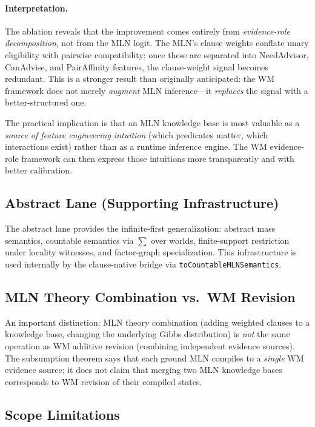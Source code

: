 \documentclass[11pt,openany]{report}
\begin{document}
\paragraph{Interpretation.}
The ablation reveals that the improvement comes entirely from
\emph{evidence-role decomposition}, not from the MLN logit.
The MLN's clause weights conflate unary eligibility with pairwise
compatibility; once these are separated into NeedAdvisor, CanAdvise,
and PairAffinity features, the clause-weight signal becomes redundant.
This is a stronger result than originally anticipated: the WM framework
does not merely \emph{augment} MLN inference---it \emph{replaces} the
signal with a better-structured one.

The practical implication is that an MLN knowledge base is most valuable
as a \emph{source of feature engineering intuition} (which predicates
matter, which interactions exist) rather than as a runtime inference
engine.  The WM evidence-role framework can then express those intuitions
more transparently and with better calibration.

\subsection{Abstract Lane (Supporting Infrastructure)}

The abstract lane provides the infinite-first generalization: abstract
mass semantics, countable semantics via $\sum$ over worlds,
finite-support restriction under locality witnesses, and factor-graph
specialization.  This infrastructure is used internally by the
clause-native bridge via \texttt{toCountableMLNSemantics}.

\subsection{MLN Theory Combination vs.\ WM Revision}

An important distinction: MLN theory combination (adding weighted
clauses to a knowledge base, changing the underlying Gibbs distribution)
is \emph{not} the same operation as WM additive revision (combining
independent evidence sources).  The subsumption theorem says that each
ground MLN compiles to a \emph{single} WM evidence source; it does not
claim that merging two MLN knowledge bases corresponds to WM revision of
their compiled states.

\subsection{Scope Limitations}
\end{document}
